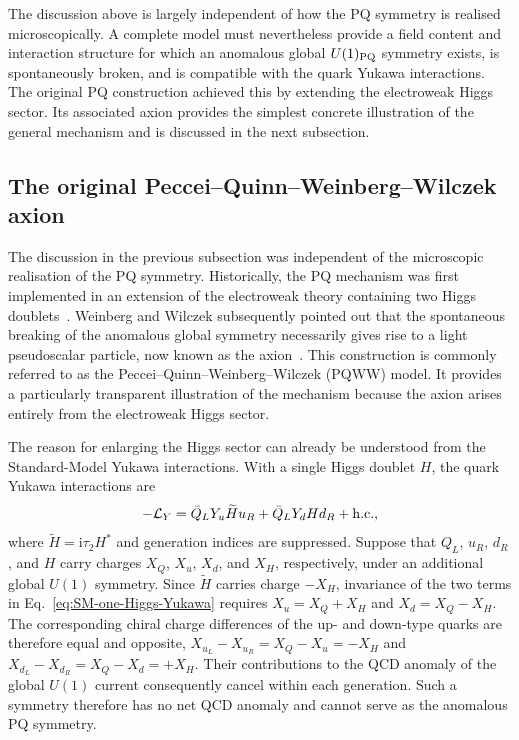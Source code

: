 \documentclass[review]{elsarticle}
\numberwithin{equation}{section}
\numberwithin{table}{section}
\numberwithin{figure}{section}
\def\i{\mathrm{i}}
\def\hc{{\rm h.c.}}
\begin{document}
The discussion above is largely independent of how the PQ symmetry is realised microscopically. A complete model must nevertheless provide a field content and interaction structure for which an anomalous global $U(1)_{\rm PQ}$ symmetry exists, is spontaneously broken, and is compatible with the quark Yukawa interactions. The original PQ construction achieved this by extending the electroweak Higgs sector. Its associated axion provides the simplest concrete illustration of the general mechanism and is discussed in the next subsection.


\subsection{The original Peccei--Quinn--Weinberg--Wilczek axion}
\label{sec:PQWW-axion}

The discussion in the previous subsection was independent of the microscopic realisation of the PQ symmetry. Historically, the PQ mechanism was first implemented in an extension of the electroweak theory containing two Higgs doublets~\cite{Peccei:1977hh,Peccei:1977ur}. Weinberg and Wilczek subsequently pointed out that the spontaneous breaking of the anomalous global symmetry necessarily gives rise to a light pseudoscalar particle, now known as the axion~\cite{Weinberg:1977ma,Wilczek:1977pj}. This construction is commonly referred to as the Peccei--Quinn--Weinberg--Wilczek (PQWW) model. It provides a particularly transparent illustration of the mechanism because the axion arises entirely from the electroweak Higgs sector.

The reason for enlarging the Higgs sector can already be understood from the Standard-Model Yukawa interactions. With a single Higgs doublet $H$, the quark Yukawa interactions are
\begin{align}
    -\mathcal{L}_Y = \bar Q_LY_u\widetilde H u_R
    + \bar Q_LY_dH d_R +\hc ,
    \label{eq:SM-one-Higgs-Yukawa}
\end{align}
where $\widetilde H=\i\tau_2 H^*$ and generation indices are suppressed. Suppose that $Q_L$, $u_R$, $d_R$, and $H$ carry charges $X_Q$, $X_u$, $X_d$, and $X_H$, respectively, under an additional global $U(1)$ symmetry. Since $\widetilde H$ carries charge $-X_H$, invariance of the two terms in Eq.~\eqref{eq:SM-one-Higgs-Yukawa} requires
$X_u=X_Q+X_H$ and $X_d=X_Q-X_H$. The corresponding chiral charge differences of the up- and down-type quarks are therefore equal and opposite,
$X_{u_L}-X_{u_R}=X_Q-X_u=-X_H$ and
$X_{d_L}-X_{d_R}=X_Q-X_d=+X_H$. Their contributions to the QCD anomaly of the global $U(1)$ current consequently cancel within each generation. Such a symmetry therefore has no net QCD anomaly and cannot serve as the anomalous PQ symmetry.
\end{document}
